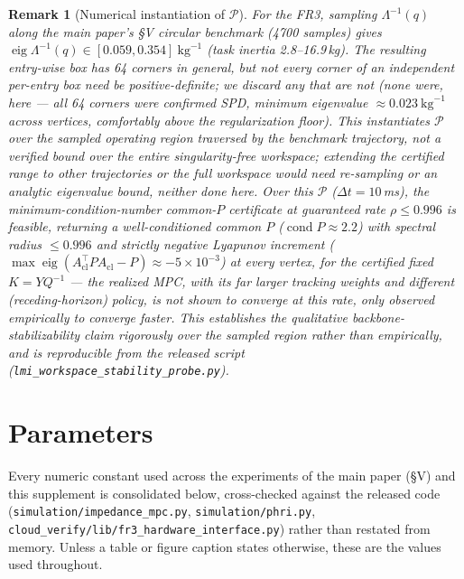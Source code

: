 \documentclass[journal]{IEEEtran}
\newtheorem{remark}{Remark}
\newcommand{\Laminv}{\Lambda^{-1}(q)}
\begin{document}
\begin{remark}[Numerical instantiation of $\mathcal P$]\label{rem:instantiation}
For the FR3, sampling $\Laminv$ along the main paper's \S V circular
benchmark (4700 samples) gives
$\operatorname{eig}\Laminv\in[0.059,0.354]\ \text{kg}^{-1}$ (task
inertia 2.8--16.9\,kg). The resulting entry-wise box has 64 corners in
general, but not every corner of an independent per-entry box need be
positive-definite; we discard any that are not (none were, here --- all
64 corners were confirmed SPD, minimum eigenvalue $\approx0.023\
\text{kg}^{-1}$ across vertices, comfortably above the regularization
floor). This instantiates $\mathcal P$ over the \emph{sampled operating
region traversed by the benchmark trajectory}, not a verified bound over
the entire singularity-free workspace; extending the certified range to
other trajectories or the full workspace would need re-sampling or an
analytic eigenvalue bound, neither done here. Over this $\mathcal P$
($\Delta t=10$\,ms), the minimum-condition-number common-$P$ certificate
at guaranteed rate $\rho\le0.996$ is feasible, returning a
well-conditioned common $P$ ($\operatorname{cond}P\approx2.2$) with
spectral radius $\le0.996$ and strictly negative Lyapunov increment
($\max\operatorname{eig}(A_\text{cl}^\top PA_\text{cl}-P)\approx-5\times10^{-3}$)
at every vertex, \emph{for the certified fixed $K=YQ^{-1}$} --- the
realized MPC, with its far larger tracking weights and different
(receding-horizon) policy, is not shown to converge at this rate, only
observed empirically to converge faster. This establishes the
qualitative backbone-stabilizability claim rigorously over the sampled
region rather than empirically, and is reproducible from the released
script (\texttt{lmi\_workspace\_stability\_probe.py}).
\end{remark}

\section{Parameters}\label{sec:params}

Every numeric constant used across the experiments of the main paper
(\S V) and this supplement is consolidated below, cross-checked against
the released code (\texttt{simulation/impedance\_mpc.py},
\texttt{simulation/phri.py},
\texttt{cloud\_verify/lib/fr3\_hardware\_interface.py}) rather than
restated from memory. Unless a table or figure caption states otherwise,
these are the values used throughout.
\end{document}
